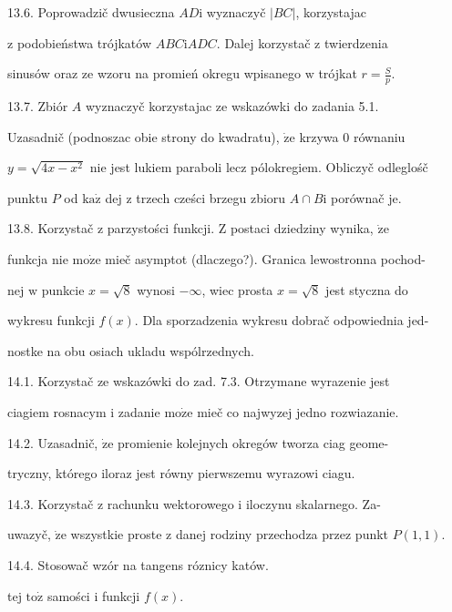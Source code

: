 \documentclass[a4paper,12pt]{article}
\begin{document}
13.6. Poprowadzič dwusieczna $AD \mathrm{i}$ wyznaczyč $|BC|$, korzystajac

$\mathrm{z}$ podobieństwa trójkatów $ABC \mathrm{i} ADC$. Dalej korzystač $\mathrm{z}$ twierdzenia

sinusów oraz ze wzoru na promień okregu wpisanego $\mathrm{w}$ trójkat $r=\displaystyle \frac{S}{p}.$

13.7. Zbiór $A$ wyznaczyč korzystajac ze wskazówki do zadania 5.1.

Uzasadnič (podnoszac obie strony do kwadratu), $\dot{\mathrm{z}}\mathrm{e}$ krzywa $0$ równaniu

$y=\sqrt{4x-x^{2}}$ nie jest lukiem paraboli lecz pólokregiem. Obliczyč odleglośč

punktu $P$ od $\mathrm{k}\mathrm{a}\dot{\mathrm{z}}$ dej $\mathrm{z}$ trzech cześci brzegu zbioru $A\cap B\mathrm{i}$ porównač je.

13.8. Korzystač $\mathrm{z}$ parzystości funkcji. $\mathrm{Z}$ postaci dziedziny wynika, $\dot{\mathrm{z}}\mathrm{e}$

funkcja nie $\mathrm{m}\mathrm{o}\dot{\mathrm{z}}\mathrm{e}$ mieč asymptot (dlaczego?). Granica lewostronna pochod-

nej $\mathrm{w}$ punkcie $x = \sqrt{8}$ wynosi $-\infty$, wiec prosta $x = \sqrt{8}$ jest styczna do

wykresu funkcji $f(x)$. Dla sporzadzenia wykresu dobrač odpowiednia jed-

nostke na obu osiach ukladu wspólrzednych.

14.1. Korzystač ze wskazówki do $\mathrm{z}\mathrm{a}\mathrm{d}$. 7.3. Otrzymane wyrazenie jest

ciagiem rosnacym $\mathrm{i}$ zadanie $\mathrm{m}\mathrm{o}\dot{\mathrm{z}}\mathrm{e}$ mieč co najwyzej jedno rozwiazanie.

14.2. Uzasadnič, $\dot{\mathrm{z}}\mathrm{e}$ promienie kolejnych okregów tworza ciag geome-

tryczny, którego iloraz jest równy pierwszemu wyrazowi ciagu.

14.3. Korzystač $\mathrm{z}$ rachunku wektorowego $\mathrm{i}$ iloczynu skalarnego. Za-

uwazyč, $\dot{\mathrm{z}}\mathrm{e}$ wszystkie proste $\mathrm{z}$ danej rodziny przechodza przez punkt $P(1,1).$

14.4. Stosowač wzór na tangens róznicy katów.

tej $\mathrm{t}\mathrm{o}\dot{\mathrm{z}}$ samości $\mathrm{i}$ funkcji $f(x).$
\end{document}
